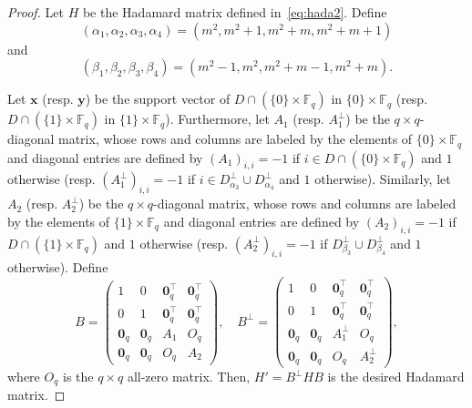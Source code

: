\documentclass[10pt]{amsart}
\theoremstyle{definition}
\newcommand*\F{{\mathbb F}}
\newcommand*\tra{\top}
\newcommand*{\bfx}{\mathbf{x}}
\newcommand*{\bfy}{\mathbf{y}}
\newcommand*{\bfo}{\mathbf{0}}
\begin{document}
\begin{proof}
Let $H$ be the Hadamard matrix defined in~\eqref{eq:hada2}. Define
\[
(\alpha_1,\alpha_2,\alpha_3,\alpha_4)=(m^2,m^2+1,m^2+m,m^2+m+1)
\]
and
\[
(\beta_1,\beta_2,\beta_3,\beta_4)=(m^2-1,m^2,m^2+m-1,m^2+m).
\]

Let $\bfx$ (resp. $\bfy$) be the support vector of $D\cap (\{0\}\times \F_q)$ in $\{0\}\times \F_q$ (resp. $D\cap (\{1\}\times \F_q)$ in $\{1\}\times \F_q$). Furthermore, let $A_1$ (resp. $A_1^{\perp}$) be the $q\times q$-diagonal matrix, whose rows and columns are labeled by the elements of $\{0\}\times \F_q$ and diagonal entries are defined by $(A_1)_{i,i}=-1$ if $i\in D\cap (\{0\}\times \F_q)$ and $1$ otherwise (resp. $(A_1^\perp)_{i,i}=-1$ if $i\in D_{\alpha_3}^\perp \cup D_{\alpha_4}^\perp$ and $1$ otherwise). Similarly, let $A_2$ (resp. $A_2^{\perp}$) be the $q\times q$-diagonal matrix, whose rows and columns are labeled by the elements of $\{1\}\times \F_q$ and diagonal entries are defined by $(A_2)_{i,i}=-1$ if $D\cap (\{1\}\times \F_q)$ and $1$ otherwise (resp. $(A_2^\perp)_{i,i}=-1$ if $D_{\beta_3}^\perp \cup D_{\beta_4}^\perp$ and $1$ otherwise). Define
\[
B=
\begin{pmatrix} 1 &0 & \bfo_q^\tra& \bfo_q^\tra \\
0 &1 & \bfo_q^\tra& \bfo_q^\tra \\
\bfo_q &\bfo_q & A_1& O_q \\
\bfo_q & \bfo_q &O_q& A_2
\end{pmatrix}, \quad B^\perp=
\begin{pmatrix} 1 &0 & \bfo_q^\tra& \bfo_q^\tra \\
0 &1 & \bfo_q^\tra& \bfo_q^\tra \\
\bfo_q &\bfo_q & A_1^\perp& O_q \\
\bfo_q & \bfo_q &O_q& A_2^\perp
\end{pmatrix},
\]
where $O_q$ is the $q\times q$ all-zero matrix. Then, $H'=B^\perp H B$ is the desired Hadamard matrix.


\end{proof}
\end{document}
